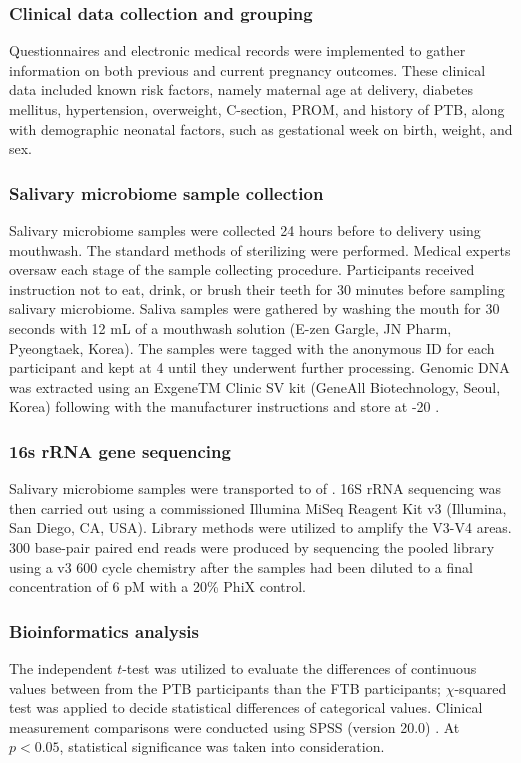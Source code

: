 \documentclass[11pt, a4paper, onecolumn, oneside]{report}
\begin{document}
            \subsubsection{Clinical data collection and grouping}
                Questionnaires and electronic medical records were implemented to gather information on both previous and current pregnancy outcomes. These clinical data included known risk factors, namely maternal age at delivery, diabetes mellitus, hypertension, overweight, C-section, PROM, and history of PTB, along with demographic neonatal factors, such as gestational week on birth, weight, and sex.

            \subsubsection{Salivary microbiome sample collection}
                Salivary microbiome samples were collected 24 hours before to delivery using mouthwash. The standard methods of sterilizing were performed. Medical experts oversaw each stage of the sample collecting procedure. Participants received instruction not to eat, drink, or brush their teeth for 30 minutes before sampling salivary microbiome. Saliva samples were gathered by washing the mouth for 30 seconds with 12 mL of a mouthwash solution (E-zen Gargle, JN Pharm, Pyeongtaek, Korea). The samples were tagged with the anonymous ID for each participant and kept at 4 \textcelsius until they underwent further processing. Genomic DNA was extracted using an ExgeneTM Clinic SV kit (GeneAll Biotechnology, Seoul, Korea) following with the manufacturer instructions and store at -20 \textcelsius.

            \subsubsection{16s rRNA gene sequencing}
                Salivary microbiome samples were transported to  of . 16S rRNA sequencing was then carried out using a commissioned Illumina MiSeq Reagent Kit v3 (Illumina, San Diego, CA, USA). Library methods were utilized to amplify the V3-V4 areas. 300 base-pair paired end reads were produced by sequencing the pooled library using a v3 600 cycle chemistry after the samples had been diluted to a final concentration of 6 pM with a 20\% PhiX control.

            \subsubsection{Bioinformatics analysis}
                The independent $t$-test was utilized to evaluate the differences of continuous values between from the PTB participants than the FTB participants; $\chi$-squared test was applied to decide statistical differences of categorical values. Clinical measurement comparisons were conducted using SPSS (version 20.0) \cite{SPSS-1}. At $p < 0.05$, statistical significance was taken into consideration.
\end{document}
